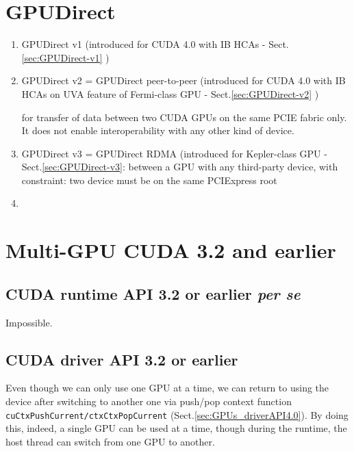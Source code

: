 \section{GPUDirect}
\label{sec:GPUDirect}

\begin{enumerate}
  \item GPUDirect v1 (introduced for CUDA 4.0 with IB
  HCAs - Sect.\ref{sec:GPUDirect-v1} )
  
  
  \item GPUDirect v2 = GPUDirect peer-to-peer (introduced for CUDA 4.0 with IB
  HCAs on UVA feature of Fermi-class GPU - Sect.\ref{sec:GPUDirect-v2} )
  
  for transfer of data between two CUDA GPUs on the same PCIE fabric only. It
  does not enable interoperability with any other kind of device.
  
  
  \item GPUDirect v3 = GPUDirect RDMA (introduced for Kepler-class GPU -
  Sect.\ref{sec:GPUDirect-v3}:
  between a GPU with any third-party device, with constraint: two device must be on the same PCIExpress root
  
  
  \item 
\end{enumerate}


\section{Multi-GPU CUDA 3.2 and earlier }
\label{sec:multi-GPU_3.2}

\subsection{CUDA runtime API 3.2 or earlier {\it per se}}
\label{sec:one-a-time_CUDA3.2-runtime}

Impossible.



\subsection{CUDA driver API 3.2 or earlier}
\label{sec:one-a-time_CUDA3.2-driver}

Even though we can only use one GPU at a time, we can return to using the device
after switching to another one via push/pop context function
\verb!cuCtxPushCurrent/ctxCtxPopCurrent! (Sect.\ref{sec:GPUs_driverAPI4.0}). By
doing this, indeed, a single GPU can be
  used at a time, though during the runtime, the host thread can switch from one
  GPU to another.
  

